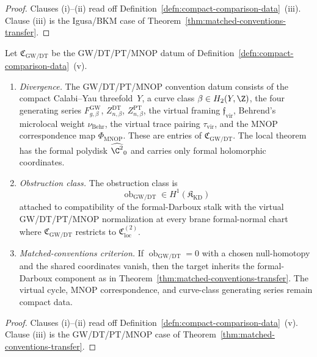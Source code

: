 \begin{proof}
  Clauses (i)--(ii) read off
  Definition~\ref{defn:compact-comparison-data}~(iii).
  Clause (iii) is the Igusa/BKM case of
  Theorem~\ref{thm:matched-conventions-transfer}.
\end{proof}

\begin{thm}\label{thm:divergence-gwdt}
  Let \(\mathfrak C_{\mathrm{GW/DT}}\) be the GW/DT/PT/MNOP datum of
  Definition~\ref{defn:compact-comparison-data}~(v).
  \begin{enumerate}[label=(\roman*)]
    \item \emph{Divergence.}  The GW/DT/PT/MNOP convention datum
      consists of the compact Calabi--Yau threefold~\(Y\), a curve class
      \(\beta\in H_2(Y,\Z)\), the four generating series
      \(F^{\mathrm{GW}}_{g,\beta}\),
      \(Z^{\mathrm{DT}}_{n,\beta}\),
      \(Z^{\mathrm{PT}}_{n,\beta}\), the virtual framing
      \(\mathfrak f_{\mathrm{vir}}\), Behrend's microlocal weight
      \(\nu_{\mathrm{Behr}}\), the virtual trace pairing
      \(\tau_{\mathrm{vir}}\), and the MNOP correspondence map
      \(\Phi_{\mathrm{MNOP}}\).  These are entries of
      \(\mathfrak C_{\mathrm{GW/DT}}\).  The local theorem has the
      formal polydisk
      \(\widehat{\C^2}_0\) and carries only formal holomorphic
      coordinates.
    \item \emph{Obstruction class.}  The obstruction class is
      \[
        \operatorname{ob}_{\mathrm{GW/DT}}
          \in
          H^1(\mathfrak K_{\mathrm{KD}})
      \]
	      attached to compatibility of the formal-Darboux stalk with the
	      virtual GW/DT/PT/MNOP normalization at every brane formal-normal
	      chart where \(\mathfrak C_{\mathrm{GW/DT}}\) restricts to
	      \(\mathfrak C_{\mathrm{loc}}^{(2)}\).
    \item \emph{Matched-conventions criterion.}  If
      \(\operatorname{ob}_{\mathrm{GW/DT}}=0\) with a chosen
      null-homotopy and the shared coordinates vanish, then the
      target inherits the formal-Darboux component as in
      Theorem~\ref{thm:matched-conventions-transfer}.  The virtual
      cycle, MNOP correspondence, and curve-class generating series
      remain compact data.
  \end{enumerate}
\end{thm}

\begin{proof}
  Clauses (i)--(ii) read off
  Definition~\ref{defn:compact-comparison-data}~(v).
  Clause (iii) is the GW/DT/PT/MNOP case of
  Theorem~\ref{thm:matched-conventions-transfer}.
\end{proof}

